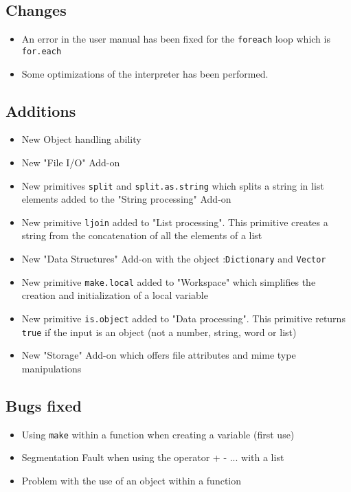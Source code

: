 \subsection{Changes}

\begin{itemize}
\item An error in the user manual has been fixed for the {\tt foreach} loop which is {\tt for.each}
\item Some optimizations of the interpreter has been performed. 
\end{itemize}

\subsection{Additions}

\begin{itemize}
\item New Object handling ability
\item New "File I/O" Add-on
\item New primitives {\tt split} and {\tt split.as.string} which splits a string in list elements added to the "String processing" Add-on
\item New primitive {\tt ljoin} added to "List processing". This primitive creates a string from the concatenation of all the elements of a list
\item New "Data Structures" Add-on with the object :{\tt Dictionary} and {\tt Vector} 
\item New primitive {\tt make.local} added to "Workspace" which simplifies the creation and initialization of a local variable
\item New primitive {\tt is.object} added to "Data processing". This primitive returns {\tt true} if the input is an object (not a number, string, word or list)
\item New "Storage" Add-on which offers file attributes and mime type manipulations
\end{itemize}

\subsection{Bugs fixed}

\begin{itemize}
\item Using {\tt make} within a function when creating a variable (first use)
\item Segmentation Fault when using the operator + - ... with a list
\item Problem with the use of an object within a function
\end{itemize}


